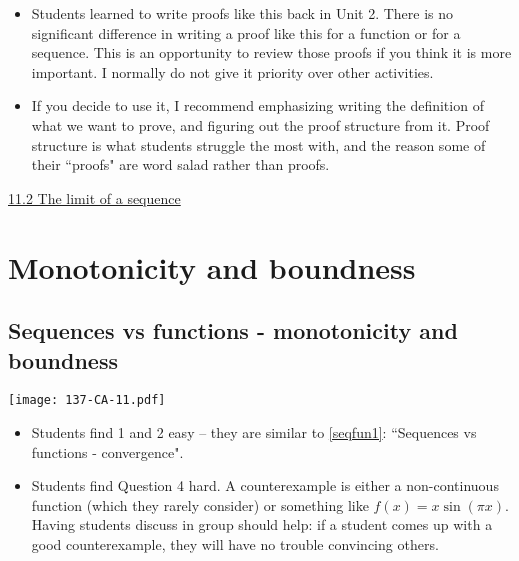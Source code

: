 \documentclass[11pt]{article}
\newcommand {\DS} [1] {${\displaystyle #1}$}
\newcommand{\nl}{\hfill \vspace{-1.1\baselineskip}} %
\newcommand{\vii}{\hspace{8mm} \href{https://www.youtube.com/watch?v=Dr8LzBA-H84&list=PLlwePzQY_wW_yFyXauToZNFNhhufzioP2&index=2}{11.2 The limit of a sequence}}
\begin{document}
\begin{comments}
\nl
	\begin{itemize}
		\item  Students learned to write proofs like this back in Unit 2.  There is no significant difference in writing a proof like this for a function or for a sequence.  This is an opportunity to review those proofs if you think it is more important.  I normally do not give it priority over other activities.
		\item If you decide to use it, I recommend emphasizing writing the definition of what we want to prove, and figuring out the proof structure from it.   Proof structure is what students struggle the most with, and the reason some of their ``proofs" are word salad rather than proofs.
	\end{itemize}
\end{comments}

\begin{videos}
\vii
\end{videos}

\newpage
\section{Monotonicity and boundness}
\subsection{Sequences vs functions - monotonicity and boundness}

\begin{center}
{ \texttt{[image: 137-CA-11.pdf]}} 
\end{center}

\begin{comments}
\nl
	\begin{itemize}
		\item  Students find 1 and 2 easy -- they are similar to \autoref{seqfun1}: ``Sequences vs functions - convergence".
		
		\item Students  find Question 4 hard.  A counterexample is either a non-continuous function (which they rarely consider) or something like \DS{f(x) = x \sin (\pi x)}.  Having students discuss in group should help:  if a student comes up with a good counterexample, they will have no trouble convincing others.
	\end{itemize}
\end{comments}
\end{document}
